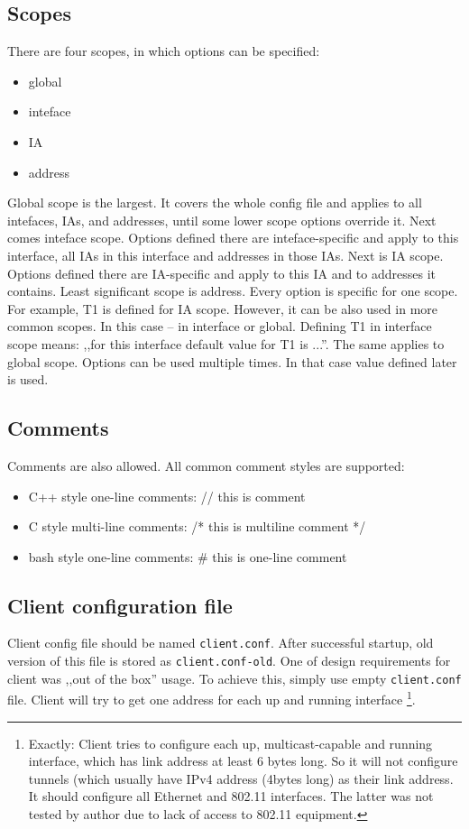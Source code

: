 \subsection{Scopes}
There are four scopes, in which options can be specified:
\begin{itemize}
\item global
\item inteface
\item IA
\item address
\end{itemize}

Global scope is the largest. It covers the whole config file and
applies to all intefaces, IAs, and addresses, until some lower scope
options override it. Next comes inteface scope. Options defined there
are inteface-specific and apply to this interface, all IAs in this
interface and addresses in those IAs. Next is IA scope. Options
defined there are IA-specific and apply to this IA and to addresses it
contains. Least significant scope is address. Every option is specific
for one scope. For example, T1 is defined for
IA scope. However, it can be also used in more common scopes. In this
case -- in interface or global. Defining T1 in interface scope means:
,,for this interface default value for T1 is ...''. The same applies
to global scope. Options can be used multiple times. In that case
value defined later is used.

\subsection{Comments}

Comments are also allowed. All common comment styles are supported:
\begin{itemize}
\item C++ style one-line comments: // this is comment
\item C style multi-line comments: /* this is multiline comment */
\item bash style one-line comments: \# this is one-line comment
\end{itemize}

\subsection{Client configuration file}

Client config file should be named \verb+client.conf+. After
successful startup, old version of this file is stored as
\verb+client.conf-old+. One of design requirements for client was
,,out of the box'' usage. To achieve this, simply use empty
\verb+client.conf+ file. Client will try to get one address for each up and
running interface \footnote{Exactly: Client tries to configure each
  up, multicast-capable and running interface, which has link address
  at least 6 bytes long. So it will not configure tunnels (which
  usually have IPv4 address (4bytes long) as their link address. It
  should configure all Ethernet and 802.11 interfaces. The latter was
  not tested by author due to lack of access to 802.11 equipment.}.

